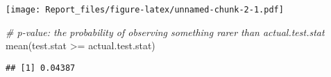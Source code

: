 \documentclass[
]{article}
\newenvironment{Shaded}{\begin{snugshade}}{\end{snugshade}}
\newcommand{\CommentTok}[1]{\textcolor[rgb]{0.56,0.35,0.01}{\textit{#1}}}
\newcommand{\FunctionTok}[1]{\textcolor[rgb]{0.00,0.00,0.00}{#1}}
\newcommand{\NormalTok}[1]{#1}
\newcommand{\SpecialCharTok}[1]{\textcolor[rgb]{0.00,0.00,0.00}{#1}}
\begin{document}
\texttt{[image: Report\_files/figure-latex/unnamed-chunk-2-1.pdf]}

\begin{Shaded}
\begin{Highlighting}[]
\CommentTok{\# p{-}value: the probability of observing something rarer than actual.test.stat}
\FunctionTok{mean}\NormalTok{(test.stat }\SpecialCharTok{\textgreater{}=}\NormalTok{ actual.test.stat)}
\end{Highlighting}
\end{Shaded}

\begin{verbatim}
## [1] 0.04387
\end{verbatim}
\end{document}
